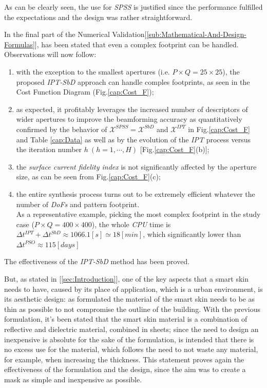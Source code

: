 As can be clearly seen, the use for \emph{SPSS} is justified since
the performance fulfilled the expectations and the design was rather
straightforward.

In the final part of the Numerical Validation[\ref{sub:Mathematical-And-Design-Formulas}], has been
stated that even a complex footprint can be handled. Observations
will now follow:

\begin{enumerate}
\item with the exception to the smallest apertures (i.e. $P\times Q=25\times25$),
the proposed \emph{IPT-SbD} approach can handle comples footprints,
as seen in the Cost Function Diagram (Fig.\ref{cap:Cost_F});
\item as expected, it profitably leverages the increased number of descriptors
of wider apertures to improve the beamforming accuracy as quantitatively
confirmed by the behavior of $\mathcal{X}^{SPSS}=\mathcal{X}^{SbD}$
and $\mathcal{X}^{IPT}$ in Fig.\ref{cap:Cost_F} and Table \ref{cap:Data}
as well as by the evolution of the \emph{IPT} process versus the iteration
number $h\:(h=1,\cdots,H)$ {[}Fig.\ref{cap:Cost_F}(b){]};
\item the \emph{surface current fidelity index} is not significantly affected
by the aperture size, as can be seen from Fig.\ref{cap:Cost_F}(c);
\item the entire synthesis process turns out to be extremely efficient whatever
the number of \emph{DoFs} and pattern footprint. \\
As a representative example, picking the most complex footprint in
the study case ($P\times Q=400\times400$), the whole \emph{CPU} time
is $\Delta t^{IPT}+\Delta t^{SbD}\approx1066.1[s]\simeq18[min]$,
which significantly lower than $\Delta t^{PSO}\approx115[days]$
\end{enumerate}
The effectiveness of the \emph{IPT-SbD} method has been proved.

But, as stated in [\ref{sec:Introduction}], one of the key aspects
that a smart skin needs to have, caused by its place of application,
which is a urban environment, is its aesthetic design: as formulated
the material of the smart skin needs to be as thin as possible to
not compromise the outline of the building. With the previous formulation,
it's been stated that the smart skin material is a combination of
reflective and dielectric material, combined in sheets; since the
need to design an inexpensive is absolute for the sake of the formulation,
is intended that there is no excess use for the material, which follows
the need to not waste any material, for example, when increasing the
thickness. This statement proves again the effectiveness of the formulation
and the design, since the aim was to create a mask as simple and inexpensive
as possible. 

